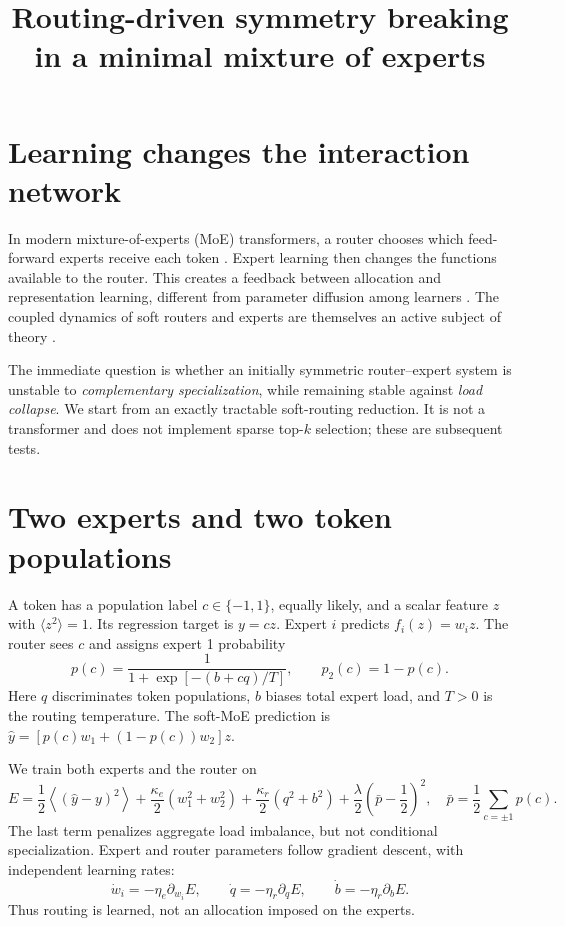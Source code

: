 \documentclass[11pt]{article}
\title{Routing-driven symmetry breaking in a minimal mixture of experts}
\author{}
\date{}
\begin{document}
\maketitle

\section{Learning changes the interaction network}

In modern mixture-of-experts (MoE) transformers, a router chooses which
feed-forward experts receive each token \cite{fedus2022,mixtral2024,deepseek2024}.
Expert learning then changes the functions available to the router.
This creates a feedback between allocation and representation learning,
different from parameter diffusion among learners \cite{arola2024}.
The coupled dynamics of soft routers and experts are themselves an
active subject of theory \cite{liao2026}.

The immediate question is whether an initially symmetric router--expert
system is unstable to \emph{complementary specialization}, while remaining
stable against \emph{load collapse}. We start from an exactly tractable
soft-routing reduction. It is not a transformer and does not implement
sparse top-$k$ selection; these are subsequent tests.

\section{Two experts and two token populations}

A token has a population label $c\in\{-1,1\}$, equally likely, and a
scalar feature $z$ with $\langle z^2\rangle=1$. Its regression target
is $y=cz$. Expert $i$ predicts $f_i(z)=w_i z$.
The router sees $c$ and assigns expert 1 probability
\begin{equation}
p(c)=\frac{1}{1+\exp[-(b+cq)/T]},
\qquad p_2(c)=1-p(c).
\label{eq:routing}
\end{equation}
Here $q$ discriminates token populations, $b$ biases total expert load,
and $T>0$ is the routing temperature. The soft-MoE prediction is
$\hat y=[p(c)w_1+(1-p(c))w_2]z$.

We train both experts and the router on
\begin{equation}
E=\frac12\left\langle(\hat y-y)^2\right\rangle
+\frac{\kappa_e}{2}(w_1^2+w_2^2)
+\frac{\kappa_r}{2}(q^2+b^2)
+\frac{\lambda}{2}\left(\bar p-\frac12\right)^2,
\quad
\bar p=\frac12\sum_{c=\pm1}p(c).
\label{eq:loss}
\end{equation}
The last term penalizes aggregate load imbalance, but not conditional
specialization. Expert and router parameters follow gradient descent,
with independent learning rates:
\begin{equation}
\dot w_i=-\eta_e\partial_{w_i}E,\qquad
\dot q=-\eta_r\partial_qE,\qquad
\dot b=-\eta_r\partial_bE.
\label{eq:dynamics}
\end{equation}
Thus routing is learned, not an allocation imposed on the experts.
\end{document}
